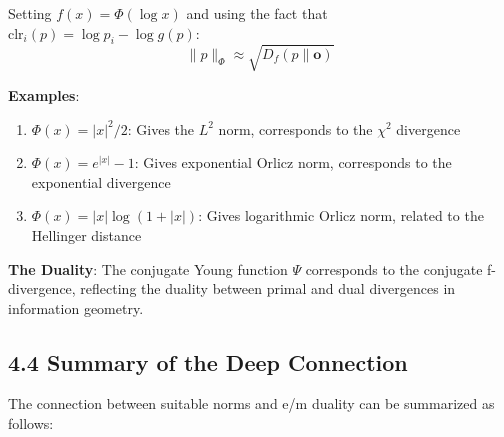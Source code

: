 \documentclass{amsart}
\theoremstyle{plain}
\theoremstyle{definition}
\theoremstyle{remark}
\begin{document}
Setting $f(x) = \Phi(\log x)$ and using the fact that $\text{clr}_i(p) = \log p_i - \log g(p)$:
\[
\|p\|_\Phi \approx \sqrt{D_f(p\|\mathbf{o})}
\]

\textbf{Examples}:

\begin{enumerate}
	\item \textbf{$\Phi(x) = |x|^2/2$}: Gives the $L^2$ norm, corresponds to the $\chi^2$ divergence
	\item \textbf{$\Phi(x) = e^{|x|} - 1$}: Gives exponential Orlicz norm, corresponds to the exponential divergence
	\item \textbf{$\Phi(x) = |x|\log(1+|x|)$}: Gives logarithmic Orlicz norm, related to the Hellinger distance
\end{enumerate}

\textbf{The Duality}: The conjugate Young function $\Psi$ corresponds to the conjugate f-divergence, reflecting the duality between primal and dual divergences in information geometry.

\subsection{4.4 Summary of the Deep Connection}

The connection between suitable norms and e/m duality can be summarized as follows:
\end{document}
